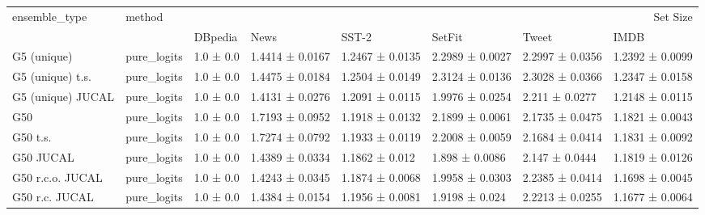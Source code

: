 \begin{tabular}{llllllll}
\toprule
ensemble_type & method & \multicolumn{6}{r}{Set Size} \\
 &  & DBpedia & News & SST-2 & SetFit & Tweet & IMDB \\
\midrule
G5 (unique) & pure_logits & 1.0 ± 0.0 & 1.4414 ± 0.0167 & 1.2467 ± 0.0135 & 2.2989 ± 0.0027 & 2.2997 ± 0.0356 & 1.2392 ± 0.0099 \\
G5 (unique) t.s. & pure_logits & 1.0 ± 0.0 & 1.4475 ± 0.0184 & 1.2504 ± 0.0149 & 2.3124 ± 0.0136 & 2.3028 ± 0.0366 & 1.2347 ± 0.0158 \\
G5 (unique) JUCAL & pure_logits & 1.0 ± 0.0 & 1.4131 ± 0.0276 & 1.2091 ± 0.0115 & 1.9976 ± 0.0254 & 2.211 ± 0.0277 & 1.2148 ± 0.0115 \\
G50 & pure_logits & 1.0 ± 0.0 & 1.7193 ± 0.0952 & 1.1918 ± 0.0132 & 2.1899 ± 0.0061 & 2.1735 ± 0.0475 & 1.1821 ± 0.0043 \\
G50 t.s. & pure_logits & 1.0 ± 0.0 & 1.7274 ± 0.0792 & 1.1933 ± 0.0119 & 2.2008 ± 0.0059 & 2.1684 ± 0.0414 & 1.1831 ± 0.0092 \\
G50 JUCAL & pure_logits & 1.0 ± 0.0 & 1.4389 ± 0.0334 & 1.1862 ± 0.012 & 1.898 ± 0.0086 & 2.147 ± 0.0444 & 1.1819 ± 0.0126 \\
G50 r.c.o. JUCAL & pure_logits & 1.0 ± 0.0 & 1.4243 ± 0.0345 & 1.1874 ± 0.0068 & 1.9958 ± 0.0303 & 2.2385 ± 0.0414 & 1.1698 ± 0.0045 \\
G50 r.c. JUCAL & pure_logits & 1.0 ± 0.0 & 1.4384 ± 0.0154 & 1.1956 ± 0.0081 & 1.9198 ± 0.024 & 2.2213 ± 0.0255 & 1.1677 ± 0.0064 \\
\bottomrule
\end{tabular}
